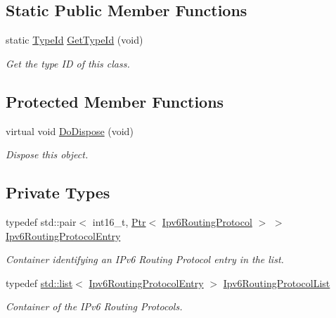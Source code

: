 \subsection*{Static Public Member Functions}
\begin{DoxyCompactItemize}
\item 
static \hyperlink{classns3_1_1TypeId}{Type\+Id} \hyperlink{classns3_1_1Ipv6ListRouting_a2a1e3ee20de076b049451e4a675e438b}{Get\+Type\+Id} (void)
\begin{DoxyCompactList}\small\item\em Get the type ID of this class. \end{DoxyCompactList}\end{DoxyCompactItemize}
\subsection*{Protected Member Functions}
\begin{DoxyCompactItemize}
\item 
virtual void \hyperlink{classns3_1_1Ipv6ListRouting_a71c24e3a4fc051e12bc1731c238a7bc6}{Do\+Dispose} (void)
\begin{DoxyCompactList}\small\item\em Dispose this object. \end{DoxyCompactList}\end{DoxyCompactItemize}
\subsection*{Private Types}
\begin{DoxyCompactItemize}
\item 
typedef std\+::pair$<$ int16\+\_\+t, \hyperlink{classns3_1_1Ptr}{Ptr}$<$ \hyperlink{classns3_1_1Ipv6RoutingProtocol}{Ipv6\+Routing\+Protocol} $>$ $>$ \hyperlink{classns3_1_1Ipv6ListRouting_a319efc7e5387bd5e2ca63ffe82daa15d}{Ipv6\+Routing\+Protocol\+Entry}
\begin{DoxyCompactList}\small\item\em Container identifying an I\+Pv6 Routing Protocol entry in the list. \end{DoxyCompactList}\item 
typedef \hyperlink{openflow-interface_8h_afd9bcfa176617760671b67580f536fa7}{std\+::list}$<$ \hyperlink{classns3_1_1Ipv6ListRouting_a319efc7e5387bd5e2ca63ffe82daa15d}{Ipv6\+Routing\+Protocol\+Entry} $>$ \hyperlink{classns3_1_1Ipv6ListRouting_ac06678936e0664598621368bbfa8f6de}{Ipv6\+Routing\+Protocol\+List}
\begin{DoxyCompactList}\small\item\em Container of the I\+Pv6 Routing Protocols. \end{DoxyCompactList}\end{DoxyCompactItemize}
